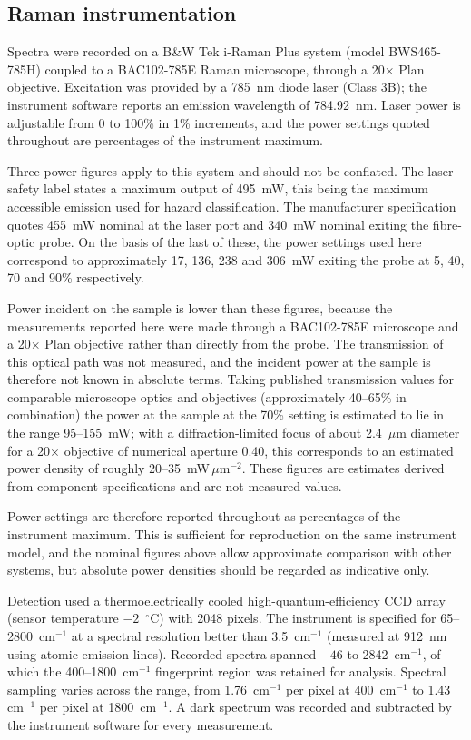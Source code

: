 \documentclass[preprint,12pt]{elsarticle}
\newcommand{\wn}{\ensuremath{\mathrm{cm}^{-1}}}
\begin{document}
\subsection{Raman instrumentation}

Spectra were recorded on a B\&W Tek i-Raman Plus system (model BWS465-785H)
coupled to a BAC102-785E Raman microscope, through a 20$\times$ Plan objective.
Excitation was provided by a 785~nm diode laser (Class 3B); the instrument
software reports an emission wavelength of 784.92~nm. Laser power is adjustable
from 0 to 100\% in 1\% increments, and the power settings quoted throughout are
percentages of the instrument maximum.

Three power figures apply to this system and should not be conflated. The laser
safety label states a maximum output of 495~mW, this being the maximum accessible
emission used for hazard classification. The manufacturer specification quotes
455~mW nominal at the laser port and 340~mW nominal exiting the fibre-optic
probe. On the basis of the last of these, the power settings used here correspond
to approximately 17, 136, 238 and 306~mW exiting the probe at 5, 40, 70 and 90\%
respectively.

Power incident on the sample is lower than these figures, because the
measurements reported here were made through a BAC102-785E microscope and a
20$\times$ Plan objective rather than directly from the probe. The transmission
of this optical path was not measured, and the incident power at the sample is
therefore not known in absolute terms. Taking published transmission values for
comparable microscope optics and objectives (approximately 40--65\% in
combination) the power at the sample at the 70\% setting is estimated to lie in
the range 95--155~mW; with a diffraction-limited focus of about 2.4~$\mu$m
diameter for a 20$\times$ objective of numerical aperture 0.40, this corresponds
to an estimated power density of roughly 20--35~mW\,$\mu$m$^{-2}$. These figures
are estimates derived from component specifications and are not measured values.

Power settings are therefore reported throughout as percentages of the instrument
maximum. This is sufficient for reproduction on the same instrument model, and
the nominal figures above allow approximate comparison with other systems, but
absolute power densities should be regarded as indicative only.

Detection used a thermoelectrically cooled high-quantum-efficiency CCD array
(sensor temperature $-2$~$^{\circ}$C) with 2048 pixels. The instrument is
specified for 65--2800~\wn{} at a spectral resolution better than 3.5~\wn{}
(measured at 912~nm using atomic emission lines). Recorded spectra spanned
$-46$ to 2842~\wn{}, of which the 400--1800~\wn{} fingerprint region was
retained for analysis. Spectral sampling varies across the range, from
1.76~\wn{} per pixel at 400~\wn{} to 1.43~\wn{} per pixel at 1800~\wn{}. A dark
spectrum was recorded and subtracted by the instrument software for every
measurement.
\end{document}
